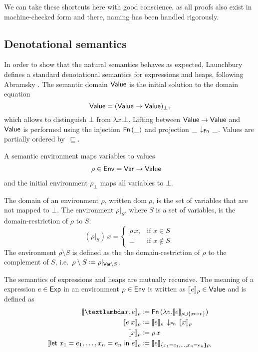 \documentclass{scrartcl}
\theoremstyle{nonumberbreak}
\newcommand{\sVar}  {\text{\textsf{Var}}}
\newcommand{\sExp}  {\text{\textsf{Exp}}}
\newcommand{\sValue}{\text{\textsf{Value}}}
\newcommand{\sEnv}  {\text{\textsf{Env}}}
\newcommand{\sFn}[1]{\text{\textsf{Fn}}\,(#1)}
\newcommand{\sFnProj}[2]{#1\,\downarrow_{\text{\textsf{Fn}}}\,#2}
\newcommand{\sApp}[2]{#1\;#2}
\newcommand{\sLam}[2]{\text{\textlambda} #1.\, #2}
\newcommand{\sLet}[2]{\text{\textsf{let}}\ #1\ \text{\textsf{in}}\ #2}
\newcommand{\dom}[1]{\text{dom}\;#1}
\newcommand{\xeng}{x_1 = e_1, \ldots, x_n = e_n}
\newcommand{\dsem}[2]{\llbracket #1 \rrbracket_{#2}}
\newcommand{\esem}[1]{\{\!\!\!\{#1\}\!\!\!\}}
\newcommand{\shortcite}{\cite}
\begin{document}
We can take these shortcuts here with good conscience, as all proofs also exist in machine-checked form and there, naming has been handled rigorously.

\subsection{Denotational semantics}

In order to show that the natural semantics behaves as expected, Launchbury defines a standard denotational semantics for expressions and heaps, following Abramsky \shortcite{abramsky}. The semantic domain $\sValue$ is the initial solution to the domain equation 
\[
\sValue = (\sValue \to \sValue)_\bot,
\]
which allows to distinguish $\bot$ from $\lambda x. \bot$. Lifting between $\sValue \to \sValue$ and $\sValue$ is performed using the injection $\sFn \_$ and projection $\sFnProj{\_}{\_}$. Values are partially ordered by~$\sqsubseteq$.

A semantic environment maps variables to values
\begin{alignat*}{2}
\rho \in \sEnv &= \sVar \to \sValue
\end{alignat*}
and the initial environment $\rho_\bot$ maps all variables to $\bot$.

The domain of an environment $\rho$, written $\dom\rho$, is the set of variables that are not mapped to $\bot$.
The environment $\rho|_S$, where $S$ is a set of variables, is the domain-restriction of $\rho$ to $S$:
\[
(\rho |_S)\, x = 
\begin{cases}
\rho\, x,& \text{if } x \in S\\
\bot& \text{if } x \not\in S.
\end{cases}
\]
The environment $\rho\setminus S$ is defined as the the domain-restriction of $\rho$ to the complement of $S$, i.e.\ \mbox{$\rho\setminus S \coloneqq \rho|_{\sVar \setminus S}$}.

The semantics of expressions and heaps are mutually recursive. The meaning of a expression $e \in \sExp$ in an environment $\rho \in \sEnv$ is written as $\dsem e \rho \in \sValue$ and is defined as
\begin{align*}
\dsem{\sLam x e}\rho &\coloneqq \sFn{\lambda v. \dsem e {\rho \sqcup \{x \mapsto v\}}}\\
\dsem{\sApp e  x}\rho &\coloneqq \sFnProj {\dsem e \rho}{\dsem x \rho}\\
\dsem{x}\rho &\coloneqq \rho\,x\\
\dsem{\sLet{\xeng}e}\rho &\coloneqq \dsem e {\esem{\xeng}\rho.}
\end{align*}
\end{document}
